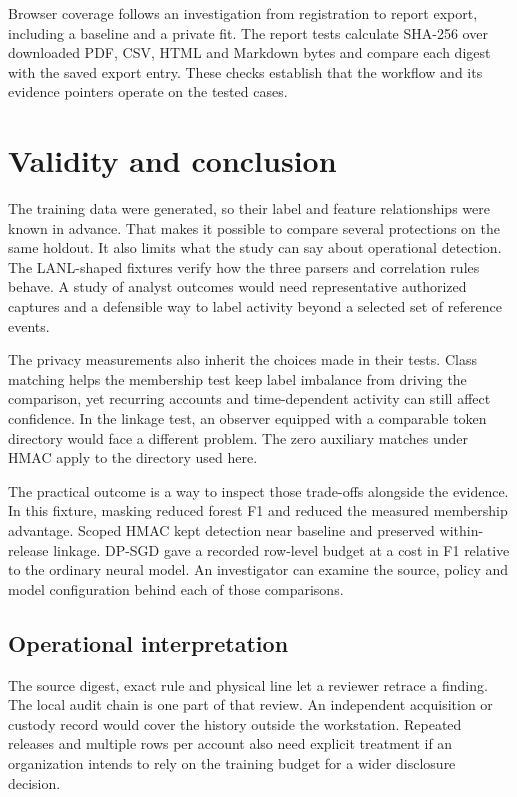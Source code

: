 \documentclass[conference]{IEEEtran}
\begin{document}
Browser coverage follows an investigation from registration to report export, including a baseline and a private fit. The report tests calculate SHA-256 over downloaded PDF, CSV, HTML and Markdown bytes and compare each digest with the saved export entry. These checks establish that the workflow and its evidence pointers operate on the tested cases.

\clearpage
\section{Validity and conclusion}
The training data were generated, so their label and feature relationships were known in advance. That makes it possible to compare several protections on the same holdout. It also limits what the study can say about operational detection. The LANL-shaped fixtures verify how the three parsers and correlation rules behave. A study of analyst outcomes would need representative authorized captures and a defensible way to label activity beyond a selected set of reference events.

The privacy measurements also inherit the choices made in their tests. Class matching helps the membership test keep label imbalance from driving the comparison, yet recurring accounts and time-dependent activity can still affect confidence. In the linkage test, an observer equipped with a comparable token directory would face a different problem. The zero auxiliary matches under HMAC apply to the directory used here.

The practical outcome is a way to inspect those trade-offs alongside the evidence. In this fixture, masking reduced forest F1 and reduced the measured membership advantage. Scoped HMAC kept detection near baseline and preserved within-release linkage. DP-SGD gave a recorded row-level budget at a cost in F1 relative to the ordinary neural model. An investigator can examine the source, policy and model configuration behind each of those comparisons.

\subsection{Operational interpretation}
The source digest, exact rule and physical line let a reviewer retrace a finding. The local audit chain is one part of that review. An independent acquisition or custody record would cover the history outside the workstation. Repeated releases and multiple rows per account also need explicit treatment if an organization intends to rely on the training budget for a wider disclosure decision.
\end{document}
